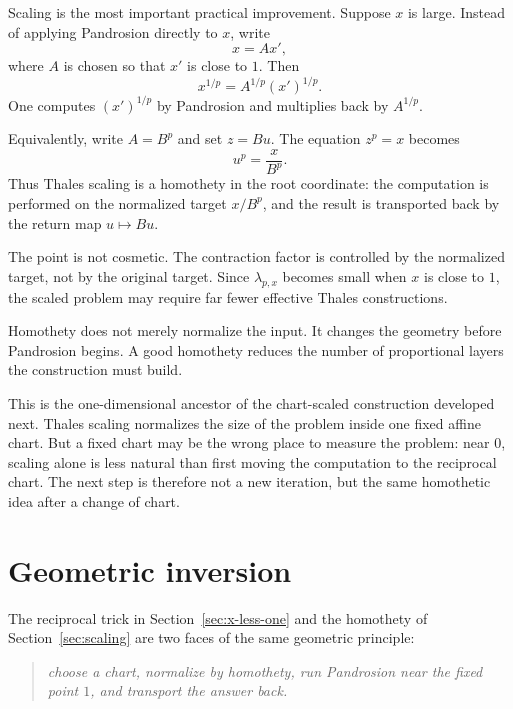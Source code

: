 \documentclass[10pt,a4paper]{article}
\theoremstyle{plain}
\theoremstyle{definition}
\theoremstyle{remark}
\newenvironment{takeaway}{%
  \begin{center}\begin{minipage}{0.92\linewidth}\small\itshape\color{blue!45!black}%
}{%
  \end{minipage}\end{center}%
}
\begin{document}
Scaling is the most important practical improvement.  Suppose $x$ is large.
Instead of applying Pandrosion directly to $x$, write
\begin{equation}
  x=A x',
  \label{eq:scaling-factor}
\end{equation}
where $A$ is chosen so that $x'$ is close to $1$.  Then
\[
  x^{1/p}=A^{1/p}(x')^{1/p}.
\]
One computes $(x')^{1/p}$ by Pandrosion and multiplies back by $A^{1/p}$.

Equivalently, write $A=B^p$ and set $z=Bu$.  The equation $z^p=x$ becomes
\[
  u^p=\frac{x}{B^p}.
\]
Thus Thales scaling is a homothety in the root coordinate: the computation is
performed on the normalized target $x/B^p$, and the result is transported back
by the return map $u\mapsto Bu$.

The point is not cosmetic.  The contraction factor is controlled by the
normalized target, not by the original target.  Since $\lambda_{p,x}$ becomes
small when $x$ is close to $1$, the scaled problem may require far fewer
effective Thales constructions.

\begin{takeaway}
Homothety does not merely normalize the input.  It changes the geometry before
Pandrosion begins.  A good homothety reduces the number of proportional layers
the construction must build.
\end{takeaway}

This is the one-dimensional ancestor of the chart-scaled construction developed
next.  Thales scaling normalizes the size of the problem inside one fixed
affine chart.  But a fixed chart may be the wrong place to measure the problem:
near $0$, scaling alone is less natural than first moving the computation to
the reciprocal chart.  The next step is therefore not a new iteration, but the
same homothetic idea after a change of chart.

\section{Geometric inversion}
\label{sec:geometric-inversion}

The reciprocal trick in Section~\ref{sec:x-less-one} and the homothety of
Section~\ref{sec:scaling} are two faces of the same geometric principle:

\begin{quote}
\emph{choose a chart, normalize by homothety, run Pandrosion near the fixed
point $1$, and transport the answer back.}
\end{quote}
\end{document}
